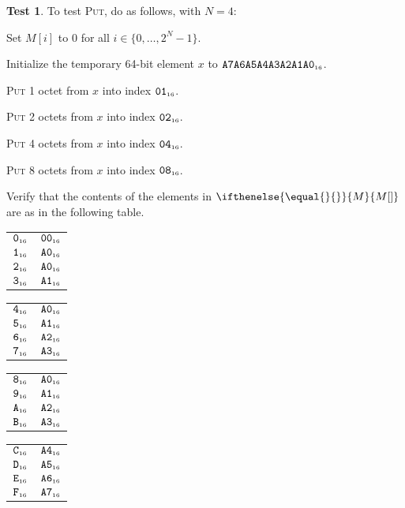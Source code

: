 \documentclass[a4paper,12pt]{article}
\makeatletter
\newcommand{\num}[1]{\texttt{#1}}
\newcommand{\hex}[1]{\num{#1}_{\textup{\tiny 16}}}
\newcommand{\MEM}[1]{\ifthenelse{\equal{#1}{}}{M}{M[#1]}}
\newcommand{\range}[2]{\{#1,\ldots,#2\}}
\newcommand{\proc}[1]{\textsc{#1}}
\theoremstyle{definition}
\newtheorem{test}{Test}
\newenvironment{memtable}{%
  \begin{trivlist}
    \item
    }{%
    \end{trivlist}}
\newenvironment{memcolumn}{%
  \begin{tabular}{@{}ll@{}}
    \hline}
    {%
    \hline
  \end{tabular}}
\newcommand{\memspace}{\qquad}
\makeatother
\begin{document}
\begin{test}
  To test \proc{Put}, do as follows, with $N=4$:
  \begin{stepnumbers}
  \item Set $M[i]$ to 0 for all $i \in \range{0}{2^N-1}$.
  \item Initialize the temporary 64-bit element $x$ to $\hex{A7A6A5A4A3A2A1A0}$.
  \item \proc{Put} 1 octet  from $x$ into index $\hex{01}$.
  \item \proc{Put} 2 octets from $x$ into index $\hex{02}$.
  \item \proc{Put} 4 octets from $x$ into index $\hex{04}$.
  \item \proc{Put} 8 octets from $x$ into index $\hex{08}$.
  \item Verify that the contents of the elements in $\MEM{}$ are as in the following table.
  \end{stepnumbers}

  \begin{memtable}
    \begin{memcolumn}
      $\hex{0}$ & $\hex{00}$ \\
      $\hex{1}$ & $\hex{A0}$ \\
      $\hex{2}$ & $\hex{A0}$ \\
      $\hex{3}$ & $\hex{A1}$ \\
    \end{memcolumn}
    \memspace
    \begin{memcolumn}
      $\hex{4}$ & $\hex{A0}$ \\
      $\hex{5}$ & $\hex{A1}$ \\
      $\hex{6}$ & $\hex{A2}$ \\
      $\hex{7}$ & $\hex{A3}$ \\
    \end{memcolumn}
    \memspace
    \begin{memcolumn}
      $\hex{8}$ & $\hex{A0}$ \\
      $\hex{9}$ & $\hex{A1}$ \\
      $\hex{A}$ & $\hex{A2}$ \\
      $\hex{B}$ & $\hex{A3}$ \\
    \end{memcolumn}
    \memspace
    \begin{memcolumn}
      $\hex{C}$ & $\hex{A4}$ \\
      $\hex{D}$ & $\hex{A5}$ \\
      $\hex{E}$ & $\hex{A6}$ \\
      $\hex{F}$ & $\hex{A7}$ \\
    \end{memcolumn}
  \end{memtable}
\end{test}
\end{document}
